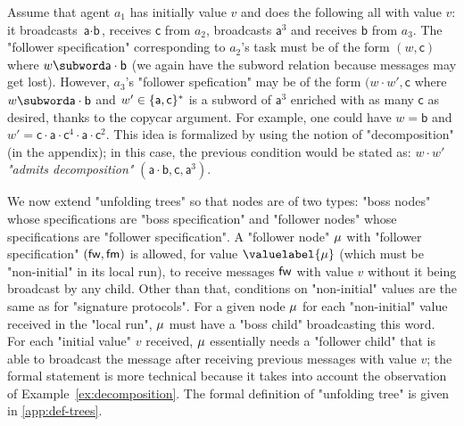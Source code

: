 \begin{example}
\label{ex:decomposition}
Assume that agent $a_1$ has initially value $v$ and does the following all with value $v$: it broadcasts $\textsf{a} \cdot \textsf{b}$, receives $\textsf{c}$ from $a_2$, broadcasts $\textsf{a}^3$ and receives $\textsf{b}$ from $a_3$. The "follower specification" corresponding to $a_2$'s task must be of the form $(w, \textsf{c})$ where $w \subword \textsf{a} \cdot \textsf{b}$ (we again have the subword relation because messages may get lost). However, $a_3$'s "follower spefication" may be of the form $(w \cdot w', \textsf{c}$ where $w \subword \textsf{a} \cdot \textsf{b}$ and $w' \in \{\textsf{a},\textsf{c}\}^*$ is a subword of $\textsf{a}^3$ enriched with as many $\textsf{c}$ as desired, thanks to the copycar argument. For example, one could have $w= \textsf{b} $ and $w' = \textsf{c} \cdot \textsf{a} \cdot \textsf{c}^4 \cdot \textsf{a} \cdot \textsf{c}^2$. This idea is formalized by using the notion of "decomposition" (in the appendix); in this case, the previous condition would be stated as: $w \cdot w'$ \emph{"admits decomposition"} $(\textsf{a} \cdot \textsf{b}, \textsf{c}, \textsf{a}^3)$.   
\end{example}

We now extend "unfolding trees" so that nodes are of two types: "boss nodes" whose specifications are "boss specification" and "follower nodes" whose specifications are "follower specification". A "follower node" $\mu$ with "follower specification" $(\mathsf{fw}, \mathsf{fm})$ is allowed, for value $\valuelabel{\node}$ (which must be "non-initial" in its local run), to receive messages $\mathsf{fw}$ with value $v$ without it being broadcast by any child. Other than that, conditions on "non-initial" values are the same as for "signature protocols". For a given node $\mu$ for each "non-initial" value received in the "local run", $\mu$ must have a "boss child" broadcasting this word. For each "initial value" $v$ received, $\mu$ essentially needs a "follower child" that is able to broadcast the message after receiving previous messages with value $v$; the formal statement is more technical because it takes into account the observation of Example~\ref{ex:decomposition}. 
The formal definition of "unfolding tree" is given in \cref{app:def-trees}.


